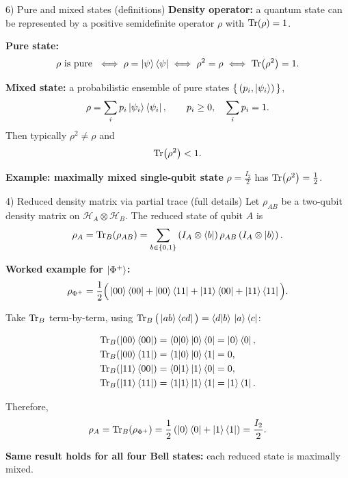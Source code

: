 \documentclass[aspectratio=169]{beamer}
\begin{document}
\begin{frame}{6) Pure and mixed states (definitions)}
\textbf{Density operator:} a quantum state can be represented by a positive semidefinite operator $\rho$
with $\Tr(\rho)=1$.

\medskip
\textbf{Pure state:}
\[
\rho \text{ is pure } \iff \rho=\ket{\psi}\bra{\psi} \iff \rho^2=\rho \iff \Tr(\rho^2)=1.
\]

\medskip
\textbf{Mixed state:} a probabilistic ensemble of pure states $\{\,(p_i,\ket{\psi_i})\,\}$,
\[
\rho=\sum_i p_i \ket{\psi_i}\bra{\psi_i},\qquad p_i\ge 0,\quad \sum_i p_i=1.
\]
Then typically $\rho^2\neq\rho$ and
\[
\Tr(\rho^2)<1.
\]

\medskip
\textbf{Example: maximally mixed single-qubit state} $\rho=\frac{I_2}{2}$ has $\Tr(\rho^2)=\frac{1}{2}$.
\end{frame}

\begin{frame}{4) Reduced density matrix via partial trace (full details)}
Let $\rho_{AB}$ be a two-qubit density matrix on $\mathcal{H}_A\otimes\mathcal{H}_B$.
The reduced state of qubit $A$ is
\[
\rho_A=\Tr_B(\rho_{AB})=\sum_{b\in\{0,1\}} \left(I_A\otimes \bra{b}\right)\rho_{AB}\left(I_A\otimes \ket{b}\right).
\]

\medskip
\textbf{Worked example for $\ket{\Phi^+}$:}
\[
\rho_{\Phi^+}=\frac{1}{2}\Big(\ket{00}\bra{00}+\ket{00}\bra{11}+\ket{11}\bra{00}+\ket{11}\bra{11}\Big).
\]

Take $\Tr_B$ term-by-term, using $\Tr_B\big(\ket{a b}\bra{c d}\big)=\braket{d}{b}\,\ket{a}\bra{c}$:

\begin{align}
\Tr_B(\ket{00}\bra{00}) &= \braket{0}{0}\ket{0}\bra{0}=\ket{0}\bra{0},\\
\Tr_B(\ket{00}\bra{11}) &= \braket{1}{0}\ket{0}\bra{1}=0,\\
\Tr_B(\ket{11}\bra{00}) &= \braket{0}{1}\ket{1}\bra{0}=0,\\
\Tr_B(\ket{11}\bra{11}) &= \braket{1}{1}\ket{1}\bra{1}=\ket{1}\bra{1}.
\end{align}

Therefore,
\[
\rho_A=\Tr_B(\rho_{\Phi^+})
=\frac{1}{2}\left(\ket{0}\bra{0}+\ket{1}\bra{1}\right)=\frac{I_2}{2}.
\]

\medskip
\textbf{Same result holds for all four Bell states:} each reduced state is maximally mixed.
\end{frame}
\end{document}
